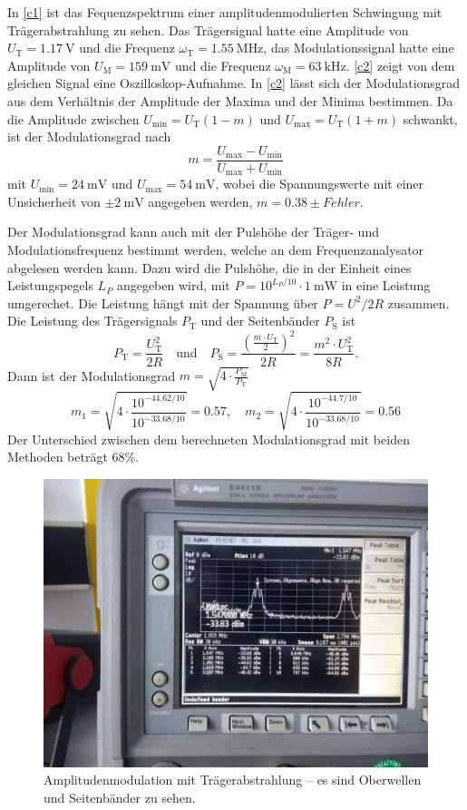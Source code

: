 In \autoref{c1} ist das Fequenzspektrum einer amplitudenmodulierten Schwingung mit Trägerabstrahlung zu sehen. Das Trägersignal hatte eine Amplitude von $U_\text{T}=\SI{1.17}{\volt}$ und die Frequenz $\omega_\text{T}=\SI{1.55}{\mega\hertz}$, das Modulationssignal hatte eine Amplitude von $U_\text{M}=\SI{159}{\milli\volt}$ und die Frequenz $\omega_\text{M}=\SI{63}{\kilo\hertz}$. \autoref{c2} zeigt von dem gleichen Signal eine Oszilloskop-Aufnahme. In \autoref{c2} lässt sich der Modulationsgrad aus dem Verhältnis der Amplitude der Maxima und der Minima bestimmen. Da die Amplitude zwischen $U_\text{min} = U_\text{T}(1 - m)$ und $U_\text{max} = U_\text{T}(1 + m)$ schwankt, ist der Modulationsgrad nach
\[
	m = \frac{U_\text{max} - U_\text{min}}{U_\text{max} + U_\text{min}}
\]
mit $U_\text{min} = \SI{24}{\milli\volt}$ und $U_\text{max} = \SI{54}{\milli\volt}$, wobei die Spannungswerte mit einer Unsicherheit von $\pm \SI{2}{\milli\volt}$ angegeben werden, $m = 0.38 \pm Fehler$.\par
\indent Der Modulationsgrad kann auch mit der Pulshöhe der Träger- und Modulationsfrequenz bestimmt werden, welche an dem Frequenzanalysator abgelesen werden kann. Dazu wird die Pulshöhe, die in der Einheit eines Leistungspegels $L_P$ angegeben wird, mit $P = 10^{L_P/10} \cdot \SI{1}{\milli\watt}$ in eine Leistung umgerechet. Die Leistung hängt mit der Spannung über $P = U^2/2R$ zusammen. Die Leistung des Trägersignals $P_\text{T}$ und der Seitenbänder $P_\text{S}$ ist
\[
P_\text{T} = \frac{U_\text{T}^2}{2R} \quad \text{und} \quad P_\text{S} = \frac{\left(\frac{m \cdot U_\text{T}}{2}\right)^2}{2R} = \frac{m^2 \cdot {U_\text{T}^2}}{8R}.
\]
Dann ist der Modulationsgrad $m = \sqrt{4 \cdot \frac{P_\text{M}}{P_\text{T}}}$
\[
	m_1 = \sqrt{4 \cdot \frac{10^{-44.62/10}}{10^{-33.68/10}}} = 0.57, \quad m_2 = \sqrt{4 \cdot \frac{10^{-44.7/10}}{10^{-33.68/10}}} = 0.56
\]
Der Unterschied zwischen dem berechneten Modulationsgrad mit beiden Methoden beträgt 68\%.

\begin{figure}
	\centering
	\includegraphics[width=\textwidth]{img/Aufgabenteil_c1.jpg}
	\caption{Amplitudenmodulation mit Trägerabstrahlung -- es sind Oberwellen und Seitenbänder zu sehen.}
	\label{c1}
\end{figure}

